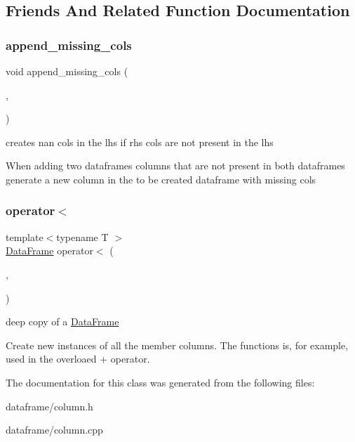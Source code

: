 \subsection{Friends And Related Function Documentation}
\mbox{\label{classColumn_a27cc8acd51a5cd40e6a2726368914661}} 
\subsubsection{\texorpdfstring{append\+\_\+missing\+\_\+cols}{append\_missing\_cols}}
{\footnotesize\ttfamily void append\+\_\+missing\+\_\+cols (\begin{DoxyParamCaption}\item[{\hyperlink{classDataFrame}{Data\+Frame} \&}]{,  }\item[{const \hyperlink{classDataFrame}{Data\+Frame} \&}]{ }\end{DoxyParamCaption})\hspace{0.3cm}{\ttfamily [friend]}}



creates nan cols in the lhs if rhs cols are not present in the lhs 

When adding two dataframes columns that are not present in both dataframes generate a new column in the to be created dataframe with missing cols \mbox{\label{classColumn_a92ccb0425c54a5b5cd6f78ed1bb4c3ff}} 
\subsubsection{\texorpdfstring{operator$<$}{operator<}}
{\footnotesize\ttfamily template$<$typename T $>$ \\
\hyperlink{classDataFrame}{Data\+Frame} operator$<$ (\begin{DoxyParamCaption}\item[{const \hyperlink{classDataFrame}{Data\+Frame} \&}]{,  }\item[{const T \&}]{ }\end{DoxyParamCaption})\hspace{0.3cm}{\ttfamily [friend]}}



deep copy of a \hyperlink{classDataFrame}{Data\+Frame} 

Create new instances of all the member columns. The functions is, for example, used in the overloaed + operator. 

The documentation for this class was generated from the following files\+:\begin{DoxyCompactItemize}
\item 
dataframe/column.\+h\item 
dataframe/column.\+cpp\end{DoxyCompactItemize}
